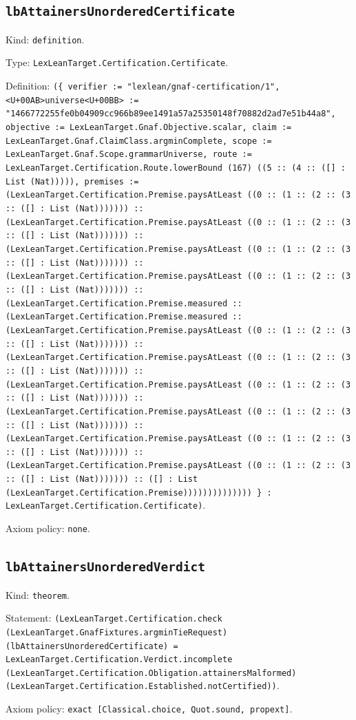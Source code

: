 \documentclass[11pt]{article}
\begin{document}
\subsection*{\texttt{lbAttainersUnorderedCertificate}}
\noindent Kind: \texttt{definition}.\par
\noindent Type: \texttt{LexLeanTarget.Certification.Certificate}.\par
\noindent Definition: \texttt{(\{ verifier := "lexlean/gnaf-certification/1", <U+00AB>universe<U+00BB> := "1466772255fe0b04909cc966b89ee1491a57a25350148f70882d2ad7e51b44a8", objective := LexLeanTarget.Gnaf.Objective.scalar, claim := LexLeanTarget.Gnaf.ClaimClass.argminComplete, scope := LexLeanTarget.Gnaf.Scope.grammarUniverse, route := LexLeanTarget.Certification.Route.lowerBound (167) ((5 :: (4 :: ([] : List (Nat))))), premises := (LexLeanTarget.Certification.Premise.paysAtLeast ((0 :: (1 :: (2 :: (3 :: ([] : List (Nat))))))) :: (LexLeanTarget.Certification.Premise.paysAtLeast ((0 :: (1 :: (2 :: (3 :: ([] : List (Nat))))))) :: (LexLeanTarget.Certification.Premise.paysAtLeast ((0 :: (1 :: (2 :: (3 :: ([] : List (Nat))))))) :: (LexLeanTarget.Certification.Premise.paysAtLeast ((0 :: (1 :: (2 :: (3 :: ([] : List (Nat))))))) :: (LexLeanTarget.Certification.Premise.measured :: (LexLeanTarget.Certification.Premise.measured :: (LexLeanTarget.Certification.Premise.paysAtLeast ((0 :: (1 :: (2 :: (3 :: ([] : List (Nat))))))) :: (LexLeanTarget.Certification.Premise.paysAtLeast ((0 :: (1 :: (2 :: (3 :: ([] : List (Nat))))))) :: (LexLeanTarget.Certification.Premise.paysAtLeast ((0 :: (1 :: (2 :: (3 :: ([] : List (Nat))))))) :: (LexLeanTarget.Certification.Premise.paysAtLeast ((0 :: (1 :: (2 :: (3 :: ([] : List (Nat))))))) :: (LexLeanTarget.Certification.Premise.paysAtLeast ((0 :: (1 :: (2 :: (3 :: ([] : List (Nat))))))) :: (LexLeanTarget.Certification.Premise.paysAtLeast ((0 :: (1 :: (2 :: (3 :: ([] : List (Nat))))))) :: ([] : List (LexLeanTarget.Certification.Premise)))))))))))))) \} : LexLeanTarget.Certification.Certificate)}.\par
\noindent Axiom policy: \texttt{none}.\par
\subsection*{\texttt{lbAttainersUnorderedVerdict}}
\noindent Kind: \texttt{theorem}.\par
\noindent Statement: \texttt{(LexLeanTarget.Certification.check (LexLeanTarget.GnafFixtures.argminTieRequest) (lbAttainersUnorderedCertificate) = LexLeanTarget.Certification.Verdict.incomplete (LexLeanTarget.Certification.Obligation.attainersMalformed) (LexLeanTarget.Certification.Established.notCertified))}.\par
\noindent Axiom policy: \texttt{exact [Classical.choice, Quot.sound, propext]}.\par
\end{document}
